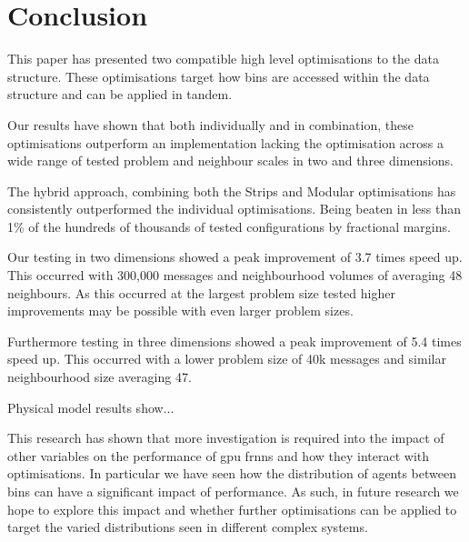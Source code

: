 \section{Conclusion\label{sec:conclusion}}
  This paper has presented two compatible high level optimisations to the  data structure. These optimisations target how bins are accessed within the data structure and can be applied in tandem.
  
  Our results have shown that both individually and in combination, these optimisations outperform an implementation lacking the optimisation across a wide range of tested problem and neighbour scales in two and three dimensions.
  
  The hybrid approach, combining both the Strips and Modular optimisations has consistently outperformed the individual optimisations. Being beaten in less than 1\% of the hundreds of thousands of tested configurations by fractional margins.
  
  Our testing in two dimensions showed a peak improvement of 3.7 times speed up. This occurred with 300,000 messages and neighbourhood volumes of averaging 48 neighbours. As this occurred at the largest problem size tested higher improvements may be possible with even larger problem sizes.

  Furthermore testing in three dimensions showed a peak improvement of 5.4 times speed up. This occurred with a lower problem size of 40k messages and similar neighbourhood size averaging 47.
  
  Physical model results show...
  
  This research has shown that more investigation is required into the impact of other variables on the performance of \gls{gpu} \gls{frnns} and how they interact with optimisations. In particular we have seen how the distribution of agents between bins can have a significant impact of performance. As such, in future research we hope to explore this impact and whether further optimisations can be applied to target the varied distributions seen in different complex systems.
  
